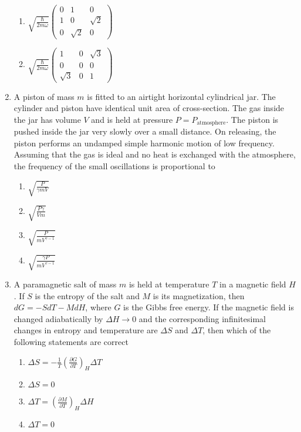 \documentclass[journal,12pt,onecolumn]{IEEEtran}
\theoremstyle{remark}
\begin{document}
\begin{enumerate}
\begin{enumerate}
        \item $\sqrt{\frac{\hbar}{2m\omega}} \begin{pmatrix}
        0 & 1 & 0 \\
        1 & 0 & \sqrt{2} \\
        0 & \sqrt{2} & 0
        \end{pmatrix}$

        \item $\sqrt{\frac{\hbar}{2m\omega}} \begin{pmatrix}
        1 & 0 & \sqrt{3} \\
        0 & 0 & 0 \\
        \sqrt{3} & 0 & 1
        \end{pmatrix}$
    \end{enumerate}

    \item A piston of mass $ m $ is fitted to an airtight horizontal cylindrical jar. The cylinder and piston have identical unit area of cross-section. The gas inside the jar has volume $ V $ and is held at pressure $ P = P_{\text{atmosphere}} $. The piston is pushed inside the jar very slowly over a small distance. On releasing, the piston performs an undamped simple harmonic motion of low frequency. Assuming that the gas is ideal and no heat is exchanged with the atmosphere, the frequency of the small oscillations is proportional to
    \begin{enumerate}
        \item $ \sqrt{\frac{P}{\gamma m V}} $
        \item $ \sqrt{\frac{P \gamma}{V m}} $
        \item $ \sqrt{\frac{P}{m V^{\gamma - 1}}} $
        \item $ \sqrt{\frac{\gamma P}{m V^{\gamma - 1}}} $
    \end{enumerate}

    \item A paramagnetic salt of mass $ m $ is held at temperature $ T $ in a magnetic field $ H $. If $ S $ is the entropy of the salt and $ M $ is its magnetization, then $ dG = -S dT - M dH $, where $ G $ is the Gibbs free energy. If the magnetic field is changed adiabatically by $ \Delta H \to 0 $ and the corresponding infinitesimal changes in entropy and temperature are $ \Delta S $ and $ \Delta T $, then which of the following statements are correct
    \begin{enumerate}
        \item $ \Delta S = - \frac{1}{T} \left( \frac{\partial G}{\partial T} \right)_{H} \Delta T $
        \item $ \Delta S = 0 $
        \item $ \Delta T = \left( \frac{\partial M}{\partial T} \right)_{H} \Delta H $
        \item $ \Delta T = 0 $
    \end{enumerate}


\end{enumerate}
\end{document}
